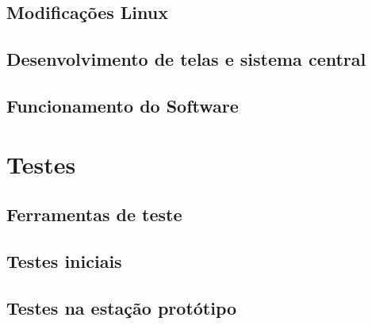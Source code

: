 \subsection{Modificações Linux}
\subsection{Desenvolvimento de telas e sistema central}
\subsection{Funcionamento do Software}

\section{Testes}

\subsection{Ferramentas de teste}
\subsection{Testes iniciais}
\subsection{Testes na estação protótipo}
